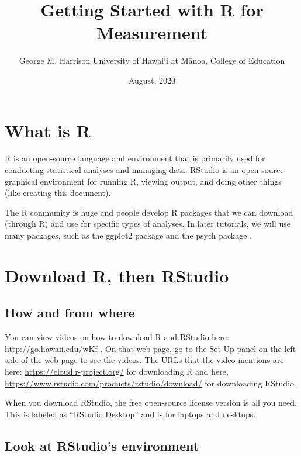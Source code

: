 \documentclass[
]{book}
\title{Getting Started with R for Measurement}
\author{George M. Harrison University of Hawai`i at Mānoa, College of Education}
\date{August, 2020}
\begin{document}
\maketitle

{
\setcounter{tocdepth}{1}
\tableofcontents
}
\hypertarget{what-is-r}{%
\chapter{What is R}\label{what-is-r}}

R \citep{R-base} is an open-source language and environment that is primarily used for conducting statistical analyses and managing data. RStudio \citep{RStudio} is an open-source graphical environment for running R, viewing output, and doing other things (like creating this document).

The R community is huge and people develop R packages that we can download (through R) and use for specific types of analyses. In later tutorials, we will use many packages, such as the ggplot2 package \citep{R-ggplot2} and the psych package \citep{R-psych}.

\hypertarget{download}{%
\chapter{Download R, then RStudio}\label{download}}

\hypertarget{how-and-from-where}{%
\section{How and from where}\label{how-and-from-where}}

You can view videos on how to download R and RStudio here: \url{http://go.hawaii.edu/wKf} . On that web page, go to the Set Up panel on the left side of the web page to see the videos. The URLs that the video mentions are here: \url{https://cloud.r-project.org/} for downloading R and here, \url{https://www.rstudio.com/products/rstudio/download/} for downloading RStudio.

When you download RStudio, the free open-source license version is all you need. This is labeled as ``RStudio Desktop'' and is for laptops and desktops.

\hypertarget{look-at-rstudios-environment}{%
\section{Look at RStudio's environment}\label{look-at-rstudios-environment}}
\end{document}

